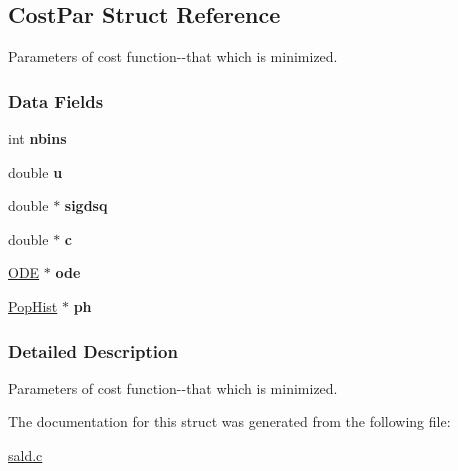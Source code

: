 \hypertarget{struct_cost_par}{\subsection{\-Cost\-Par \-Struct \-Reference}
\label{struct_cost_par}
}


\-Parameters of cost function-\/-\/that which is minimized.  


\subsubsection*{\-Data \-Fields}
\begin{DoxyCompactItemize}
\item 
\hypertarget{struct_cost_par_add5e631d434542a5173e30adcdede123}{int {\bfseries nbins}}\label{struct_cost_par_add5e631d434542a5173e30adcdede123}

\item 
\hypertarget{struct_cost_par_a04723f4d0a1e478c0025637820342aae}{double {\bfseries u}}\label{struct_cost_par_a04723f4d0a1e478c0025637820342aae}

\item 
\hypertarget{struct_cost_par_a602b33f175bb882f5099e61775821a49}{double $\ast$ {\bfseries sigdsq}}\label{struct_cost_par_a602b33f175bb882f5099e61775821a49}

\item 
\hypertarget{struct_cost_par_ae9baf57b32f714ebbd39510ab9309d48}{double $\ast$ {\bfseries c}}\label{struct_cost_par_ae9baf57b32f714ebbd39510ab9309d48}

\item 
\hypertarget{struct_cost_par_ac7b1e6bd6efc3002a923b7ce7ecff394}{\hyperlink{struct_o_d_e}{\-O\-D\-E} $\ast$ {\bfseries ode}}\label{struct_cost_par_ac7b1e6bd6efc3002a923b7ce7ecff394}

\item 
\hypertarget{struct_cost_par_a5204e90608fc9e6d04c616c5bc837a27}{\hyperlink{struct_pop_hist}{\-Pop\-Hist} $\ast$ {\bfseries ph}}\label{struct_cost_par_a5204e90608fc9e6d04c616c5bc837a27}

\end{DoxyCompactItemize}


\subsubsection{\-Detailed \-Description}
\-Parameters of cost function-\/-\/that which is minimized. 



\-The documentation for this struct was generated from the following file\-:\begin{DoxyCompactItemize}
\item 
\hyperlink{sald_8c}{sald.\-c}\end{DoxyCompactItemize}

